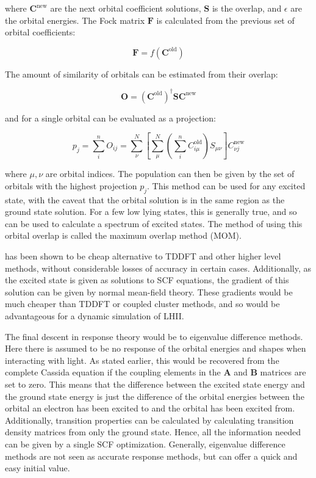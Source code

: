 where $\mathbf{C}^{\text{new}}$ are the next orbital coefficient solutions, 
$\mathbf{S}$ is the overlap, and $\epsilon$ are the orbital energies. 
The Fock matrix $\mathbf{F}$ is calculated from the previous set of orbital 
coefficients:

\begin{equation}
\mathbf{F} = f\left(\mathbf{C}^{\text{old}}\right)
\end{equation}

The amount of similarity of orbitals can be estimated from their overlap:

\begin{equation}
\mathbf{O} = \left(\mathbf{C}^{\text{old}}\right)^\dagger \mathbf{S} \mathbf{C}^{\text{new}}
\end{equation}

and for a single orbital can be evaluated as a projection:

\begin{equation}
p_j = \sum^n_i O_{ij} = \sum^N_\nu \left[\sum^N_\mu\left(\sum^n_i C_{i\mu}^{\text{old}}\right)S_{\mu\nu}\right]C^{\text{new}}_{\nu j}
\end{equation}

where $\mu,\nu$ are orbital indices. The population can then be given by the set
of orbitals with the highest projection $p_j$.  This method can be used for any
excited state, with the caveat that the orbital solution is in the same region
as the ground state solution. For a few low lying states, this is generally 
true, and so \dscf can be used to calculate a spectrum of excited states\cite{Gilbert2008}.
The method of using this orbital overlap is called the maximum overlap method (MOM).

\dscf has been shown to be cheap alternative to TDDFT and other higher level
methods, without considerable losses of accuracy in certain cases\cite{Worster2021}.
Additionally, as the excited state is given as solutions to SCF equations,
the gradient of this solution can be given by normal mean-field theory.
These gradients would be much cheaper than TDDFT or coupled cluster methods, and
so would be advantageous for a dynamic simulation of LHII.

The final descent in response theory would be to eigenvalue difference methods. 
Here there is assumed to be no response of the orbital energies and shapes when 
interacting with light. As stated earlier, this would be recovered from the
complete Cassida equation if the coupling elements in the $\mathbf{A}$ and 
$\mathbf{B}$ matrices are set to zero. This means that the difference between 
the excited state energy and the ground state energy is just the difference of
the orbital energies between the orbital an electron has been excited to and the
orbital has been excited from. Additionally, transition properties can be 
calculated by calculating transition density matrices from only the ground state.
Hence, all the information needed can be given by a single SCF optimization. 
Generally, eigenvalue difference methods are not seen as accurate response methods,
but can offer a quick and easy initial value\cite{Gimon2009}.

